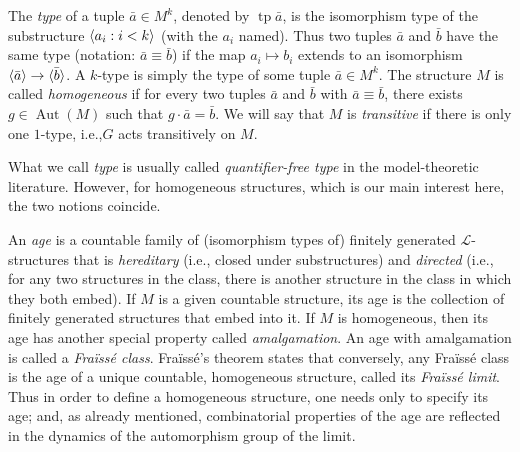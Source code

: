 \documentclass[11pt]{article}
\newcommand{\ie}{i.e.,\xspace}
\let\mathcal\mathscr
\theoremstyle{plain}
\theoremstyle{definition}
\newcommand{\cL}{\mathcal{L}}
\DeclareMathOperator{\Aut}{Aut}
\DeclareMathOperator{\tp}{tp}
\DeclarePairedDelimiter\gen{\langle}{\rangle}
\begin{document}
The \emph{type} of a tuple $\bar a \in M^k$, denoted by $\tp \bar a$, is the isomorphism type of the substructure $\gen{a_i : i < k}$ (with the $a_i$ named). Thus two tuples $\bar a$ and $\bar b$ have the same type (notation: $\bar a \equiv \bar b$) if the map $a_i \mapsto b_i$ extends to an isomorphism $\gen{\bar a} \to\nobreak \gen{\bar b}$. A $k$\nobreakdash-type is simply the type of some tuple $\bar a \in M^k$. The structure $M$ is called \emph{homogeneous} if for every two tuples $\bar a$ and $\bar b$ with $\bar a \equiv \bar b$, there exists $g \in \Aut(M)$ such that $g \cdot \bar a = \bar b$. We will say that $M$ is \emph{transitive} if there is only one $1$-type, \ie $G$ acts transitively on $M$.

What we call \emph{type} is usually called \emph{quantifier-free type} in the model-theoretic literature. However, for homogeneous structures, which is our main interest here, the two notions coincide.\enlargethispage{.5\baselineskip}%

An \emph{age} is a countable family of (isomorphism types of) finitely generated $\cL$\nobreakdash-structures that is \emph{hereditary} (\ie closed under substructures) and \emph{directed} (\ie for any two structures in the class, there is another structure in the class in which they both embed). If $M$ is a given countable structure, its age is the collection of finitely generated structures that embed into it. If $M$ is homogeneous, then its age has another special property called \emph{amalgamation}. An age with amalgamation is called a \emph{Fraïssé class}. Fraïssé's theorem states that conversely, any Fraïssé class is the age of a unique countable, homogeneous structure, called its \emph{Fraïssé limit}. Thus in order to define a homogeneous structure, one needs only to specify its age; and, as already mentioned, combinatorial properties of the age are reflected in the dynamics of the automorphism group of the limit.
\end{document}
